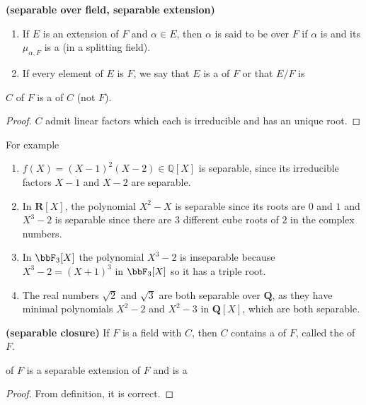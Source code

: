 \documentclass{article}
\newcommand{\bfs}[1]{\textbf{({#1}) }}
\begin{document}
\begin{defa}\bfs{separable over field, separable extension}
\begin{enumerate}
    \item If $E$ is an extension of $F$ and $\alpha \in E$, then $\alpha$ is said to be  over $F$ if $\alpha$ is  and its  $\mu_{\alpha, F}$ is a  (in a splitting field).
    \item If every element of $E$ is  $F$, we say that $E$ is a  of $F$ or that $E / F$ is 
\end{enumerate}
\end{defa}


\begin{lema}\label{lem:qmdaadd}
  $C$ of $F$ is a  of $C$ (not $F$).
\end{lema}
\begin{proof}
 $C$ admit linear factors which each is irreducible and has an unique root. 
\end{proof}

\begin{exma}For example 
\begin{enumerate}
    \item $f(X)=(X-1)^{2}(X-2) \in \mathbb{Q}[X]$ is separable, since its irreducible factors $X-1$ and $X-2$ are separable.
    \item In $\mathbf{R}[X]$, the polynomial $X^{2}-X$ is separable since its roots are $0$ and $1$ and $X^{3}-2$ is separable since there are $3$ different cube roots of $2$ in the complex numbers. 
    \item In $\bbF_{3}[X]$ the polynomial $X^{3}-2$ is inseparable because $X^{3}-2=(X+1)^{3}$ in $\bbF_{3}[X]$ so it has a triple root.
    \item The real numbers $\sqrt{2}$ and $\sqrt{3}$ are both separable over $\mathbf{Q}$, as they have minimal polynomials $X^{2}-2$ and $X^{2}-3$ in $\mathbf{Q}[X]$, which are both separable.
\end{enumerate}
\end{exma}

\begin{defa}\bfs{separable closure}
If $F$ is a field with  $C$, then $C$ contains a  of $F$, called the  of $F$.
\end{defa}
\begin{cora}
     of $F$ is a separable extension of $F$ and is a 
\end{cora}   
\begin{proof}
From definition, it is correct.
\end{proof}
\end{document}
